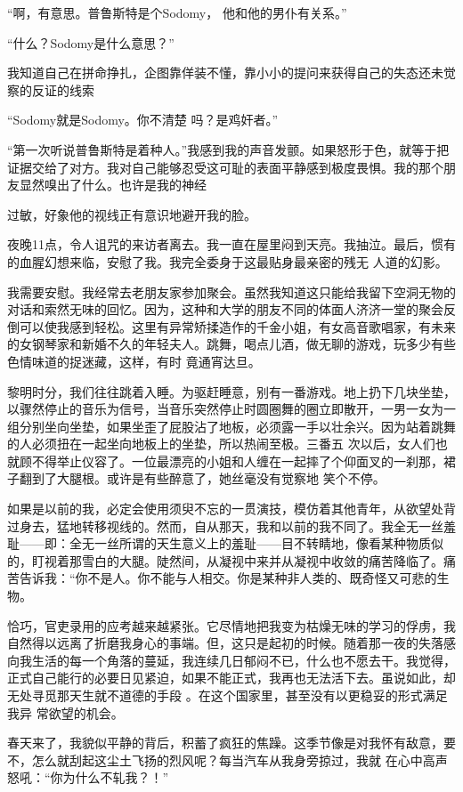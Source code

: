 \documentclass{article}
\begin{document}
“啊，有意思。普鲁斯特是个Sodomy，
他和他的男仆有关系。” 


“什么？Sodomy是什么意思？” 

我知道自己在拼命挣扎，企图靠佯装不懂，靠小小的提问来获得自己的失态还未觉察的反证的线索

“Sodomy就是Sodomy。你不清楚
吗？是鸡奸者。” 

“第一次听说普鲁斯特是着种人。”我感到我的声音发颤。如果怒形于色，就等于把证据交给了对方。我对自己能够忍受这可耻的表面平静感到极度畏惧。我的那个朋友显然嗅出了什么。也许是我的神经

\newpage
过敏，好象他的视线正有意识地避开我的脸。 

夜晚11点，令人诅咒的来访者离去。我一直在屋里闷到天亮。我抽泣。最后，惯有的血腥幻想来临，安慰了我。我完全委身于这最贴身最亲密的残无
人道的幻影。 

我需要安慰。我经常去老朋友家参加聚会。虽然我知道这只能给我留下空洞无物的对话和索然无味的回忆。因为，这种和大学的朋友不同的体面人济济一堂的聚会反倒可以使我感到轻松。这里有异常矫揉造作的千金小姐，有女高音歌唱家，有未来的女钢琴家和新婚不久的年轻夫人。跳舞，喝点儿酒，做无聊的游戏，玩多少有些色情味道的捉迷藏，这样，有时
竟通宵达旦。 

黎明时分，我们往往跳着入睡。为驱赶睡意，别有一番游戏。地上扔下几块坐垫，以骤然停止的音乐为信号，当音乐突然停止时圆圈舞的圈立即散开，一男一女为一组分别坐向坐垫，如果坐歪了屁股沾了地板，必须露一手以壮余兴。因为站着跳舞的人必须扭在一起坐向地板上的坐垫，所以热闹至极。三番五
\newpage
次以后，女人们也就顾不得举止仪容了。一位最漂亮的小姐和人缠在一起摔了个仰面叉的一刹那，裙子翻到了大腿根。或许是有些醉意了，她丝毫没有觉察地
笑个不停。 

如果是以前的我，必定会使用须臾不忘的一贯演技，模仿着其他青年，从欲望处背过身去，猛地转移视线的。然而，自从那天，我和以前的我不同了。我全无一丝羞耻——即：全无一丝所谓的天生意义上的羞耻——目不转睛地，像看某种物质似的，盯视着那雪白的大腿。陡然间，从凝视中来并从凝视中收敛的痛苦降临了。痛苦告诉我：“你不是人。你不能与人相交。你是某种非人类的、既奇怪又可悲的生物。

恰巧，官吏录用的应考越来越紧张。它尽情地把我变为枯燥无味的学习的俘虏，我自然得以远离了折磨我身心的事端。但，这只是起初的时候。随着那一夜的失落感向我生活的每一个角落的蔓延，我连续几日郁闷不已，什么也不愿去干。我觉得，正式自己能行的必要日见紧迫，如果不能正式，我再也无法活下去。虽说如此，却无处寻觅那天生就不道德的手段
\newpage
。在这个国家里，甚至没有以更稳妥的形式满足我异
常欲望的机会。 

春天来了，我貌似平静的背后，积蓄了疯狂的焦躁。这季节像是对我怀有敌意，要不，怎么就刮起这尘土飞扬的烈风呢？每当汽车从我身旁掠过，我就
在心中高声怒吼：“你为什么不轧我？！” 
\end{document}
